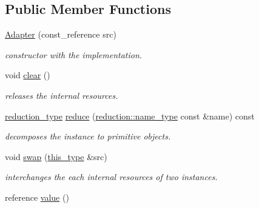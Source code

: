 \subsection*{Public Member Functions}
\begin{DoxyCompactItemize}
\item 
\hypertarget{classhryky_1_1http_1_1header_1_1comment_1_1_adapter_a60a3f04c64b4ff8e8a657c3a66b31cd9}{\hyperlink{classhryky_1_1http_1_1header_1_1comment_1_1_adapter_a60a3f04c64b4ff8e8a657c3a66b31cd9}{Adapter} (const\-\_\-reference src)}\label{classhryky_1_1http_1_1header_1_1comment_1_1_adapter_a60a3f04c64b4ff8e8a657c3a66b31cd9}

\begin{DoxyCompactList}\small\item\em constructor with the implementation. \end{DoxyCompactList}\item 
\hypertarget{classhryky_1_1_adapter_adbdbd187b837f6782b776ca8aabd411b}{void \hyperlink{classhryky_1_1_adapter_adbdbd187b837f6782b776ca8aabd411b}{clear} ()}\label{classhryky_1_1_adapter_adbdbd187b837f6782b776ca8aabd411b}

\begin{DoxyCompactList}\small\item\em releases the internal resources. \end{DoxyCompactList}\item 
\hypertarget{classhryky_1_1_adapter_a42532b43ac680d162bbc1a2e3ebc6b99}{\hyperlink{namespacehryky_a343a9a4c36a586be5c2693156200eadc}{reduction\-\_\-type} \hyperlink{classhryky_1_1_adapter_a42532b43ac680d162bbc1a2e3ebc6b99}{reduce} (\hyperlink{namespacehryky_1_1reduction_ac686c30a4c8d196bbd0f05629a6b921f}{reduction\-::name\-\_\-type} const \&name) const}\label{classhryky_1_1_adapter_a42532b43ac680d162bbc1a2e3ebc6b99}

\begin{DoxyCompactList}\small\item\em decomposes the instance to primitive objects. \end{DoxyCompactList}\item 
\hypertarget{classhryky_1_1_adapter_ae95517793bc16f6ba623bc994bc17c43}{void \hyperlink{classhryky_1_1_adapter_ae95517793bc16f6ba623bc994bc17c43}{swap} (\hyperlink{classhryky_1_1_adapter_a30de4db4c91a113187fa2f0edbcb1b2a}{this\-\_\-type} \&src)}\label{classhryky_1_1_adapter_ae95517793bc16f6ba623bc994bc17c43}

\begin{DoxyCompactList}\small\item\em interchanges the each internal resources of two instances. \end{DoxyCompactList}\item 
\hypertarget{classhryky_1_1_adapter_ab736ecd30f215ca3cbd2364f818cb83f}{reference \hyperlink{classhryky_1_1_adapter_ab736ecd30f215ca3cbd2364f818cb83f}{value} ()}\label{classhryky_1_1_adapter_ab736ecd30f215ca3cbd2364f818cb83f}


\end{DoxyCompactItemize}
